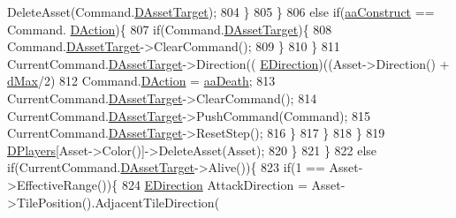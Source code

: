 \begin{DoxyCode}
      DeleteAsset(Command.\hyperlink{structSAssetCommand_a3d9b43f6e59c386c48c41a65448a0c39}{DAssetTarget});
804                                     \}
805                                 \}
806                                 \textcolor{keywordflow}{else} \textcolor{keywordflow}{if}(\hyperlink{GameDataTypes_8h_ab47668e651a3032cfb9c40ea2d60d670a7ef6b863f66dd7dcc95a199cd758ae1d}{aaConstruct} == Command.
      \hyperlink{structSAssetCommand_a8edd3b3d59a76d5514ba403bc8076a75}{DAction})\{
807                                     \textcolor{keywordflow}{if}(Command.\hyperlink{structSAssetCommand_a3d9b43f6e59c386c48c41a65448a0c39}{DAssetTarget})\{
808                                         Command.\hyperlink{structSAssetCommand_a3d9b43f6e59c386c48c41a65448a0c39}{DAssetTarget}->ClearCommand();
809                                     \}
810                                 \}
811                                 CurrentCommand.\hyperlink{structSAssetCommand_a3d9b43f6e59c386c48c41a65448a0c39}{DAssetTarget}->Direction((
      \hyperlink{GameDataTypes_8h_acb2b033915f6659a71a38b5aa6e4eb42}{EDirection})((Asset->Direction() + \hyperlink{GameDataTypes_8h_acb2b033915f6659a71a38b5aa6e4eb42af6546049275557ce0ade2ceee042a319}{dMax}/2) %
812                                 Command.\hyperlink{structSAssetCommand_a8edd3b3d59a76d5514ba403bc8076a75}{DAction} = \hyperlink{GameDataTypes_8h_ab47668e651a3032cfb9c40ea2d60d670a917cb474275eadda79115015ef00d5df}{aaDeath};
813                                 CurrentCommand.\hyperlink{structSAssetCommand_a3d9b43f6e59c386c48c41a65448a0c39}{DAssetTarget}->ClearCommand();
814                                 CurrentCommand.\hyperlink{structSAssetCommand_a3d9b43f6e59c386c48c41a65448a0c39}{DAssetTarget}->PushCommand(Command);
815                                 CurrentCommand.\hyperlink{structSAssetCommand_a3d9b43f6e59c386c48c41a65448a0c39}{DAssetTarget}->ResetStep();
816                             \}
817                         \}
818                     \}
819                     \hyperlink{classCGameModel_a524436c3560b10e1c6d6fdd0b66565dc}{DPlayers}[Asset->Color()]->DeleteAsset(Asset);
820                 \}
821             \}
822             \textcolor{keywordflow}{else} \textcolor{keywordflow}{if}(CurrentCommand.\hyperlink{structSAssetCommand_a3d9b43f6e59c386c48c41a65448a0c39}{DAssetTarget}->Alive())\{
823                 \textcolor{keywordflow}{if}(1 == Asset->EffectiveRange())\{
824                     \hyperlink{GameDataTypes_8h_acb2b033915f6659a71a38b5aa6e4eb42}{EDirection} AttackDirection = Asset->TilePosition().AdjacentTileDirection(

\end{DoxyCode}
